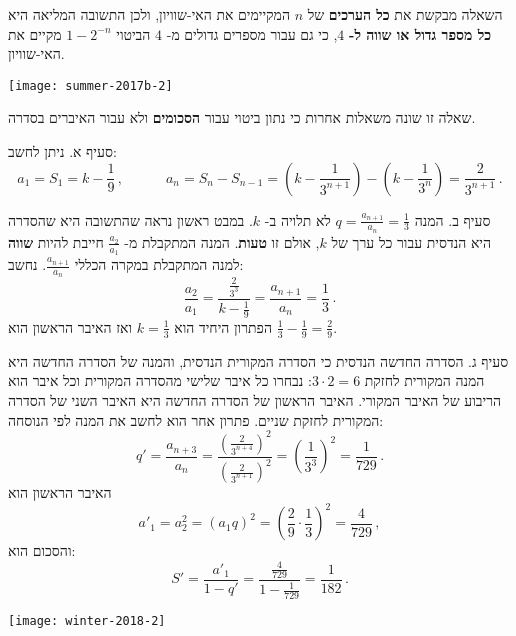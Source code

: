השאלה מבקשת את
\textbf{כל הערכים}
של
$n$
המקיימים את האי-שוויון, ולכן התשובה המליאה היא 
\textbf{כל מספר גדול או שווה ל-}%
$4$,
כי גם עבור מספרים גדולים מ-%
$4$
הביטוי
$1-2^{-n}$
מקיים את האי-שוויון.


\bigskip

\textbf{}

\begin{center}
\texttt{[image: summer-2017b-2]}
\end{center}

שאלה זו שונה משאלות אחרות כי נתון ביטוי עבור
\textbf{הסכומים}
ולא עבור האיברים בסדרה.

סעיף א. ניתן לחשב:
\[
a_1=S_1=k-\frac{1}{9}\,, \quad\quad\quad a_n=S_{n}-S_{n-1}=\left(k-\frac{1}{3^{n+1}}\right)-\left(k-\frac{1}{3^{n}}\right)=\frac{2}{3^{n+1}}\,.
\]

סעיף ב. המנה
$q=\displaystyle\frac{a_{n+1}}{a_{n}}=\frac{1}{3}$
לא תלויה ב-%
$k$.
במבט ראשון נראה שהתשובה היא שהסדרה היא הנדסית עבור כל ערך של
$k$,
אולם זו
\textbf{טעות}.
המנה המתקבלת מ-%
$\displaystyle\frac{a_2}{a_1}$
חייבת להיות
\textbf{שווה}
למנה המתקבלת במקרה הכללי
$\displaystyle\frac{a_{n+1}}{a_{n}}$.
נחשב:
\[
\frac{a_2}{a_1}=\frac{\displaystyle\frac{2}{3^3}}{\displaystyle k-\frac{1}{9}} = \frac{a_{n+1}}{a_n}=\frac{1}{3}\,.
\]
הפתרון היחיד הוא
$k=\frac{1}{3}$
ואז האיבר הראשון הוא
$\frac{1}{3}-\frac{1}{9}=\frac{2}{9}$.

סעיף ג. הסדרה החדשה הנדסית כי הסדרה המקורית הנדסית, והמנה של הסדרה החדשה היא המנה המקורית לחזקת
$3\cdot 2=6$:
נבחרו כל איבר שלישי מהסדרה המקורית וכל איבר הוא הריבוע של האיבר המקורי. האיבר הראשון של הסדרה החדשה היא האיבר השני של הסדרה המקורית לחזקת שניים. פתרון אחר הוא לחשב את המנה לפי הנוסחה:
\[
q'=\frac{a_{n+3}}{a_n}=\frac{\left(\frac{2}{3^{n+4}}\right)^2}     {\left(\frac{2}{3^{n+1}}\right)^2}=\left(\frac{1}{3^3}\right)^2=\frac{1}{729}\,.
\]
האיבר הראשון הוא
\[
a'_1 = a_2^2=\left(a_1q\right)^2=\left(\frac{2}{9}\cdot\frac{1}{3}\right)^2=\frac{4}{729}\,,
\]
והסכום הוא:
\[
S'=\frac{a'_1}{1-q'}=
\frac{\displaystyle\frac{4}{729}}{1-\displaystyle\frac{1}{729}}= \frac{1}{182}\,.
\]


\textbf{}

\begin{center}
\texttt{[image: winter-2018-2]}
\end{center}


